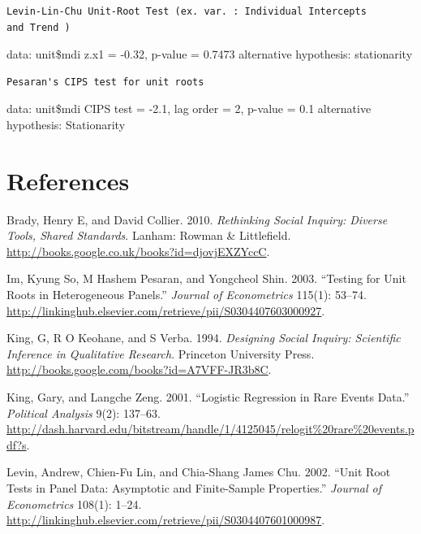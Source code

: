 \documentclass[11pt,article,oneside]{memoir}
\begin{document}
\begin{verbatim}
Levin-Lin-Chu Unit-Root Test (ex. var. : Individual Intercepts
and Trend )
\end{verbatim}

data: unit\$mdi z.x1 = -0.32, p-value = 0.7473 alternative hypothesis:
stationarity

\begin{verbatim}
Pesaran's CIPS test for unit roots
\end{verbatim}

data: unit\$mdi CIPS test = -2.1, lag order = 2, p-value = 0.1
alternative hypothesis: Stationarity

\pagebreak   

\section{References}\label{references}

\setlength{\parindent}{-0.2in} \setlength{\leftskip}{0.2in}
\setlength{\parskip}{8pt} \vspace*{-0.2in} \noindent

Brady, Henry E, and David Collier. 2010. \emph{Rethinking Social
Inquiry: Diverse Tools, Shared Standards}. Lanham: Rowman \&
Littlefield. \url{http://books.google.co.uk/books?id=djovjEXZYccC}.

Im, Kyung So, M Hashem Pesaran, and Yongcheol Shin. 2003. ``Testing for
Unit Roots in Heterogeneous Panels.'' \emph{Journal of Econometrics}
115(1): 53--74.
\url{http://linkinghub.elsevier.com/retrieve/pii/S0304407603000927}.

King, G, R O Keohane, and S Verba. 1994. \emph{Designing Social Inquiry:
Scientific Inference in Qualitative Research}. Princeton University
Press. \url{http://books.google.com/books?id=A7VFF-JR3b8C}.

King, Gary, and Langche Zeng. 2001. ``Logistic Regression in Rare Events
Data.'' \emph{Political Analysis} 9(2): 137--63.
\url{http://dash.harvard.edu/bitstream/handle/1/4125045/relogit\%20rare\%20events.pdf?s}.

Levin, Andrew, Chien-Fu Lin, and Chia-Shang James Chu. 2002. ``Unit Root
Tests in Panel Data: Asymptotic and Finite-Sample Properties.''
\emph{Journal of Econometrics} 108(1): 1--24.
\url{http://linkinghub.elsevier.com/retrieve/pii/S0304407601000987}.
\end{document}
